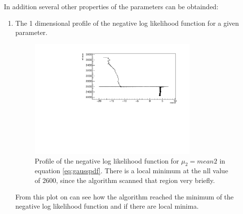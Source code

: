 \documentclass[english]{uzhpub}
\begin{document}
In addition several other properties of the parameters can be obtainded:
\begin{enumerate}
  \item The 1 dimensional profile of the negative log likelihood function for a given parameter.
  \begin{figure}[H]
    \centering
    \includegraphics[width=0.8\textwidth]{RooMCMC/walkProfile}
    \caption{Profile of the negative log likelihood function for $\mu_2 = mean2$ in equation \ref{eq:gausspdf}. There is a local minimum at the nll value of 2600, since the algorithm scanned that region very briefly.}
    \label{fig:profile}
  \end{figure}
  From this plot on can see how the algorithm reached the minimum of the negative log likelihood function and if there are local minima. \\



\end{enumerate}
\end{document}
